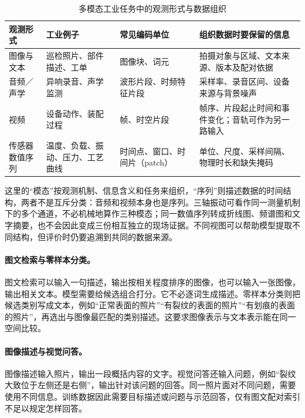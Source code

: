 \begin{table}[htbp]
\centering
\caption{多模态工业任务中的观测形式与数据组织}
\label{tab:multimodal-observation-range}
\small
\setlength{\tabcolsep}{3pt}
\begin{tabular}{@{}>{\raggedright\arraybackslash}m{1.8cm}>{\raggedright\arraybackslash}m{3.0cm}>{\raggedright\arraybackslash}m{3.0cm}>{\raggedright\arraybackslash}m{4.3cm}@{}}
\toprule
观测形式 & 工业例子 & 常见编码单位 & 组织数据时要保留的信息 \\
\midrule
图像与文本 & 巡检照片、部件描述、工单 & 图像块、词元 & 拍摄对象与区域、文本来源、版本及配对依据 \\
音频／声学 & 异响录音、声学监测 & 波形片段、时频特征片段 & 采样率、录音区间、设备来源与背景噪声 \\
视频 & 设备动作、装配过程 & 帧、时空片段 & 帧序、片段起止时间和事件变化；音轨可作为另一路输入 \\
传感器数值序列 & 温度、负载、振动、压力、工艺曲线 & 时间点、窗口、时间片（patch） & 单位、尺度、采样间隔、物理时长和缺失掩码 \\
\bottomrule
\end{tabular}
\end{table}

这里的“模态”按观测机制、信息含义和任务来组织，“序列”则描述数据的时间结构，两者不是互斥分类：音频和视频本身也是序列。三轴振动可看作同一测量机制下的多个通道，不必机械地算作三种模态；同一数值序列转成折线图、频谱图和文字摘要，也不会因此变成三份相互独立的现场证据。不同视图可以帮助模型提取不同结构，但评价时仍要追溯到共同的数据来源。

\paragraph{图文检索与零样本分类。}
图文检索可以输入一句描述，输出按相关程度排序的图像，也可以输入一张图像，输出相关文本。模型需要给候选组合打分。它不必逐词生成描述。零样本分类则把候选类别写成文本，例如“正常表面的照片”“有裂纹的表面的照片”“有划痕的表面的照片”，再选出与图像最匹配的类别描述。这要求图像表示与文本表示能在同一空间比较。

\paragraph{图像描述与视觉问答。}
图像描述输入照片，输出一段概括内容的文字。视觉问答还输入问题，例如“裂纹大致位于左侧还是右侧”，输出针对该问题的回答。同一照片面对不同问题，需要使用不同信息。训练数据因此需要目标描述或问题与示范回答，仅有图文配对索引不足以规定怎样回答。

